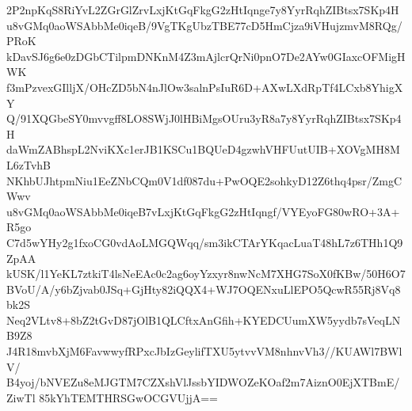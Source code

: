 2P2npKqS8RiYvL2ZGrGlZrvLxjKtGqFkgG2zHtIqnge7y8YyrRqhZIBtsx7SKp4H
u8vGMq0aoWSAbbMe0iqeB/9VgTKgUbzTBE77cD5HmCjza9iVHujzmvM8RQg/PRoK
kDavSJ6g6e0zDGbCTilpmDNKnM4Z3mAjlcrQrNi0pnO7De2AYw0GIaxcOFMigHWK
f3mPzvexGIlljX/OHcZD5bN4nJlOw3salnPsIuR6D+AXwLXdRpTf4LCxb8YhigXY
Q/91XQGbeSY0mvvgff8LO8SWjJ0lHBiMgsOUru3yR8a7y8YyrRqhZIBtsx7SKp4H
daWmZABhspL2NviKXc1erJB1KSCu1BQUeD4gzwhVHFUutUIB+XOVgMH8ML6zTvhB
NKhbUJhtpmNiu1EeZNbCQm0V1df087du+PwOQE2sohkyD12Z6thq4psr/ZmgCWwv
u8vGMq0aoWSAbbMe0iqeB7vLxjKtGqFkgG2zHtIqngf/VYEyoFG80wRO+3A+R5go
C7d5wYHy2g1fxoCG0vdAoLMGQWqq/sm3ikCTArYKqacLuaT48hL7z6THh1Q9ZpAA
kUSK/l1YeKL7ztkiT4lsNeEAc0c2ag6oyYzxyr8nwNcM7XHG7SoX0fKBw/50H6O7
BVoU/A/y6bZjvab0JSq+GjHty82iQQX4+WJ7OQENxuLlEPO5QcwR55Rj8Vq8bk2S
Neq2VLtv8+8bZ2tGvD87jOlB1QLCftxAnGfih+KYEDCUumXW5yydb7sVeqLNB9Z8
J4R18mvbXjM6FavwwyfRPxcJbIzGeylifTXU5ytvvVM8nhnvVh3//KUAWl7BWlV/
B4yoj/bNVEZu8eMJGTM7CZXshVlJssbYIDWOZeKOaf2m7AiznO0EjXTBmE/ZiwTl
85kYhTEMTHRSGwOCGVUjjA==
